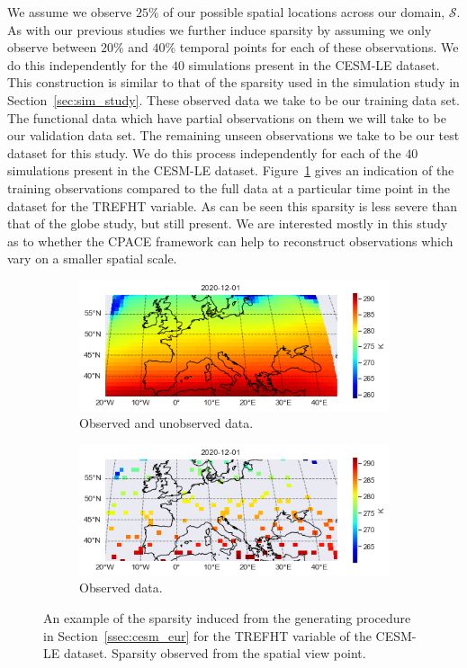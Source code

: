 We assume we observe $25\%$ of our possible spatial locations across our domain, $\mathcal{S}$.
As with our previous studies we further induce sparsity by assuming we only observe between $20\%$ and $40\%$ temporal points for each of these observations.
We do this independently for the $40$ simulations present in the CESM-LE dataset.
This construction is similar to that of the sparsity used in the simulation study in Section~\ref{sec:sim_study}.
These observed data we take to be our training data set.
The functional data which have partial observations on them we will take to be our validation data set.
The remaining unseen observations we take to be our test dataset for this study.
We do this process independently for each of the $40$ simulations present in the CESM-LE dataset.
Figure~\ref{fig:cesm_sparsity_eur} gives an indication of the training observations compared to the full data at a particular time point in the dataset for the TREFHT variable.
As can be seen this sparsity is less severe than that of the globe study, but still present.
We are interested mostly in this study as to whether the CPACE framework can help to reconstruct observations which vary on a smaller spatial scale.

\begin{figure}
	\centering
	\begin{subfigure}[b]{0.45\textwidth}
		\includegraphics[width=\textwidth]{eur_sparse_full}
		\caption{Observed and unobserved data.}
	\end{subfigure}
	\hfill        
	\begin{subfigure}[b]{0.45\textwidth}
		\includegraphics[width=\textwidth]{eur_sparse_train}
		\caption{Observed data.}
	\end{subfigure}
	\caption{An example of the sparsity induced from the  generating procedure in Section~\ref{ssec:cesm_eur} for the TREFHT variable of the CESM-LE dataset. Sparsity observed from the spatial view point.}
	\label{fig:cesm_sparsity_eur}
\end{figure}



